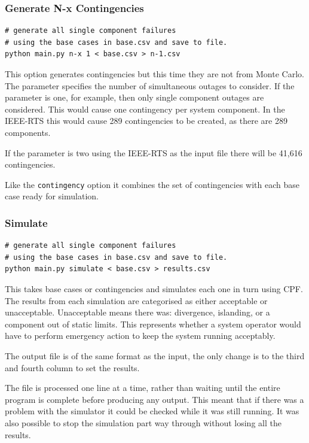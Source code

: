 \documentclass[a4paper,oneside,12pt]{report}
\begin{document}
\subsubsection{Generate N-x Contingencies}

\begin{verbatim}
# generate all single component failures
# using the base cases in base.csv and save to file.
python main.py n-x 1 < base.csv > n-1.csv
\end{verbatim}

This option generates contingencies but this time they are not from Monte Carlo. The parameter specifies the number of simultaneous outages to consider. If the parameter is one, for example, then only single component outages are considered. This would cause one contingency per system component. In the IEEE-RTS this would cause 289 contingencies to be created, as there are 289 components.

If the parameter is two using the IEEE-RTS as the input file there will be 41,616 contingencies.

Like the \texttt{contingency} option it combines the set of contingencies with each base case ready for simulation.

\subsubsection{Simulate}

\begin{verbatim}
# generate all single component failures
# using the base cases in base.csv and save to file.
python main.py simulate < base.csv > results.csv
\end{verbatim}

This takes base cases or contingencies and simulates each one in turn using
CPF. The results from each simulation are categorised as either
acceptable or unacceptable. Unacceptable means there was: divergence,
islanding, or a component out of static limits. This represents
whether a system operator would have to perform emergency action to keep
the system running acceptably.

The output file is of the same format as the input, the only change is
to the third and fourth column to set the results.

The file is processed one line at a time, rather than waiting until the entire program is complete before producing any output. This meant that if there was a problem with the simulator it could be checked while it was still running. It was also possible to stop the simulation part way through without losing all the results.
\end{document}
